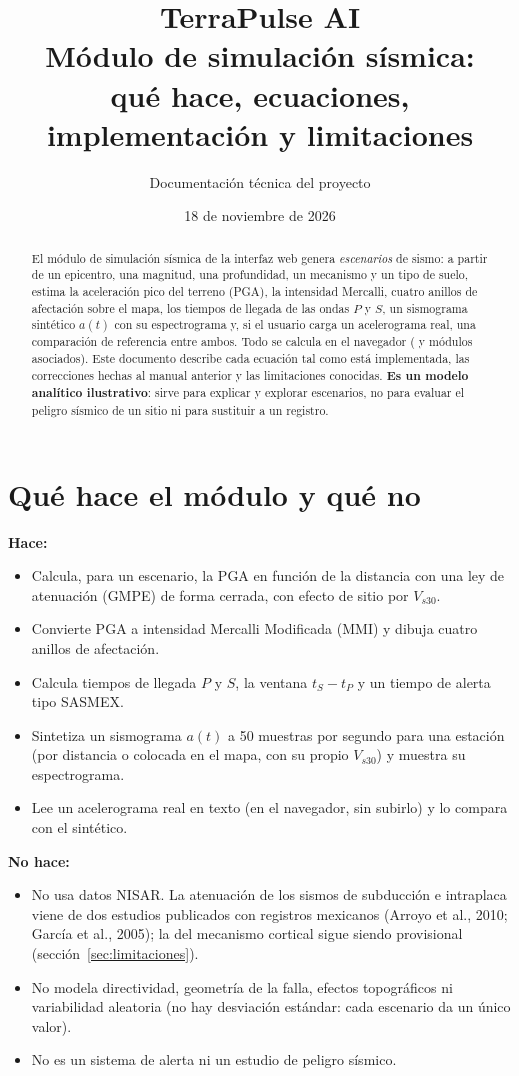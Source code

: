 \documentclass[11pt,a4paper]{article}
\title{TerraPulse AI\\[2pt]\large Módulo de simulación sísmica:\\ qué hace, ecuaciones, implementación y limitaciones}
\author{Documentación técnica del proyecto}
\date{18 de noviembre de 2026}
\begin{document}
\maketitle

\begin{abstract}
El módulo de simulación sísmica de la interfaz web genera \emph{escenarios} de sismo: a partir de un
epicentro, una magnitud, una profundidad, un mecanismo y un tipo de suelo, estima la aceleración pico
del terreno (PGA), la intensidad Mercalli, cuatro anillos de afectación sobre el mapa, los tiempos de
llegada de las ondas $P$ y $S$, un sismograma sintético $a(t)$ con su espectrograma y, si el usuario
carga un acelerograma real, una comparación de referencia entre ambos. Todo se calcula en el navegador
( y módulos asociados). Este documento describe cada ecuación tal como
está implementada, las correcciones hechas al manual anterior y las limitaciones conocidas.
\textbf{Es un modelo analítico ilustrativo}: sirve para explicar y explorar escenarios, no para evaluar
el peligro sísmico de un sitio ni para sustituir a un registro.
\end{abstract}

\tableofcontents

\section{Qué hace el módulo y qué no}

\textbf{Hace:}
\begin{itemize}
  \item Calcula, para un escenario, la PGA en función de la distancia con una ley de atenuación
        (GMPE) de forma cerrada, con efecto de sitio por $V_{s30}$.
  \item Convierte PGA a intensidad Mercalli Modificada (MMI) y dibuja cuatro anillos de afectación.
  \item Calcula tiempos de llegada $P$ y $S$, la ventana $t_S - t_P$ y un tiempo de alerta tipo SASMEX.
  \item Sintetiza un sismograma $a(t)$ a 50 muestras por segundo para una estación (por distancia o
        colocada en el mapa, con su propio $V_{s30}$) y muestra su espectrograma.
  \item Lee un acelerograma real en texto (en el navegador, sin subirlo) y lo compara con el sintético.
\end{itemize}
\textbf{No hace:}
\begin{itemize}
  \item No usa datos NISAR. La atenuación de los sismos de subducción e intraplaca viene de dos
        estudios publicados con registros mexicanos (Arroyo et al., 2010; García et al., 2005); la del
        mecanismo cortical sigue siendo provisional (sección~\ref{sec:limitaciones}).
  \item No modela directividad, geometría de la falla, efectos topográficos ni variabilidad aleatoria
        (no hay desviación estándar: cada escenario da un único valor).
  \item No es un sistema de alerta ni un estudio de peligro sísmico.
\end{itemize}
\end{document}
